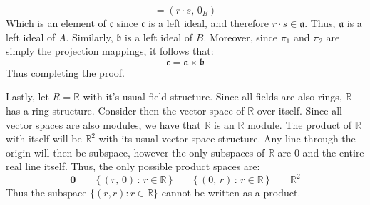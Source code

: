 \documentclass[crop=false,class=article]{standalone}                           %
\begin{document}
\begin{solution}
\begin{equation}
                =(r\cdot{s},\,0_{B})
            \end{equation}
            Which is an element of $\mathfrak{c}$ since $\mathfrak{c}$
            is a left ideal, and therefore $r\cdot{s}\in\mathfrak{a}$. Thus,
            $\mathfrak{a}$ is a left ideal of $A$. Similarly,
            $\mathfrak{b}$ is a left ideal of $B$. Moreover, since
            $\pi_{1}$ and $\pi_{2}$ are simply the projection mappings,
            it follows that:
            \begin{equation}
                \mathfrak{c}=\mathfrak{a}\times\mathfrak{b}
            \end{equation}
            Thus completing the proof.
            \par\hfill\par
            Lastly, let $R=\mathbb{R}$ with it's usual field structure.
            Since all fields are also rings, $\mathbb{R}$ has a ring
            structure. Consider then the vector space of $\mathbb{R}$ over
            itself. Since all vector spaces are also modules, we have that
            $\mathbb{R}$ is an $\mathbb{R}$ module. The product of
            $\mathbb{R}$ with itself will be $\mathbb{R}^{2}$ with its
            usual vector space structure. Any line through the origin will
            then be subspace, however the only subspaces of
            $\mathbb{R}$ are $0$ and the entire real line itself. Thus,
            the only possible product spaces are:
            \begin{equation*}
                \mathbf{0}
                \quad\quad
                \{\,(r,\,0)\,:\,r\in\mathbb{R}\,\}
                \quad\quad
                \{\,(0,\,r)\,:\,r\in\mathbb{R}\,\}
                \quad\quad
                \mathbb{R}^{2}
            \end{equation*}
            Thus the subspace $\{(r,r):r\in\mathbb{R}\}$ cannot be written
            as a product.
        \end{solution}
\end{document}
